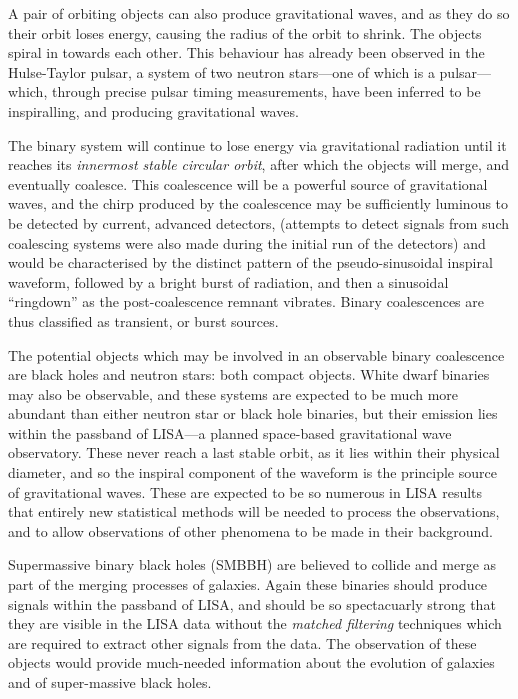 

  A pair of orbiting objects can also produce gravitational waves, and
  as they do so their orbit loses energy, causing the radius of the
  orbit to shrink\cite{1995PhRvL..74.3515B}. The objects spiral in
  towards each other. This behaviour has already been observed in the
  Hulse-Taylor
  pulsar\cite{1975ApJ...195L..51H,2005ASPC..328...25W}, a system
  of two neutron stars---one of which is a pulsar--- which, through
  precise pulsar timing measurements, have been inferred to be
  inspiralling, and producing gravitational waves.

  The binary system will continue to lose energy via gravitational
  radiation until it reaches its \emph{innermost stable circular
    orbit}, after which the objects will merge, and eventually
  coalesce. This coalescence will be a powerful source of
  gravitational waves, and the chirp produced by the coalescence may
  be sufficiently luminous to be detected by current, advanced
  detectors, (attempts to detect signals from such coalescing systems
  were also made during the initial run of the
  detectors\cite{2012PhRvD..85h2002A}) and would be characterised by
  the distinct pattern of the pseudo-sinusoidal inspiral waveform,
  followed by a bright burst of radiation, and then a sinusoidal
  ``ringdown'' as the post-coalescence remnant
  vibrates\cite{2009LRR....12....2S}. Binary coalescences are thus
  classified as transient, or burst sources.

The potential objects which may be involved in an observable binary
coalescence are black holes and neutron stars: both compact
objects. White dwarf binaries may also be observable, and these
systems are expected to be much more abundant than either neutron star
or black hole binaries, but their emission lies within the passband of
LISA---a planned space-based gravitational wave observatory. These
never reach a last stable orbit, as it lies within their physical
diameter, and so the inspiral component of the waveform is the
principle source of gravitational waves. These are expected to be so
numerous in LISA results\cite{2013GWN.....6....4A} that entirely new statistical methods will be
needed to process the observations, and to allow observations of other
phenomena to be made in their background.

Supermassive binary black holes (SMBBH) are believed to collide and
merge as part of the merging processes of galaxies. Again these
binaries should produce signals within the passband of LISA\cite{2012CQGra..29l4016A}, and
should be so spectacuarly strong that they are visible in the LISA
data without the \emph{matched filtering} techniques which are
required to extract other signals from the data\cite{2009LRR....12....2S}. The observation of
these objects would provide much-needed information about the
evolution of galaxies and of super-massive black holes.

